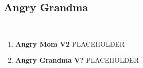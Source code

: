 \subsection*{Angry Grandma}\label{bf:Angry Grandma}
\

\begin{enumerate}[resume]
	\item\label{rt:Angry Mom} \colorbox{green!20}{\textbf{Angry Mom V2  } }
	\newline PLACEHOLDER\
	\item\label{rt:Angry Grandma} \colorbox{black!20}{\textbf{Angry Grandma V?  } }
	\newline PLACEHOLDER\
\end{enumerate}
\clearpage